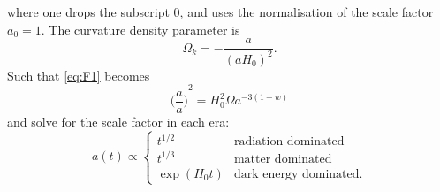 %
where one drops the subscript \(0\), and uses the normalisation of the scale factor \(a_{0}=1\).
The curvature density parameter is
%
\begin{equation}
    \Omega_{k}
    = -\frac{a}{{(aH_{0})}^{2}}.
\end{equation}
%
Such that \cref{eq:F1} becomes
%
\begin{equation}
	{\bigg(\frac{\dot{a}}{a}\bigg)}^{2}
    = H_{0}^{2} \Omega a^{-3(1+w)}
\end{equation}
%
and solve for the scale factor in each era:
%
\begin{equation}
	a(t) \propto
	\begin{cases}
		t^{1/2}    & \text{radiation dominated}    \\
		t^{1/3}    & \text{matter dominated}       \\
		\exp(H_{0}t) & \text{dark energy dominated}.
	\end{cases}
\end{equation}
